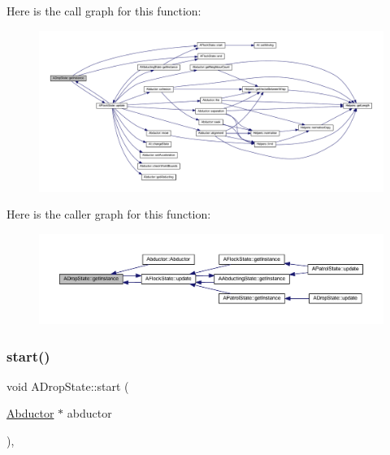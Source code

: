 Here is the call graph for this function\+:
\nopagebreak
\begin{figure}[H]
\begin{center}
\leavevmode
\includegraphics[width=350pt]{class_a_drop_state_a836c382a58447787d3c1518cccea8ebc_cgraph}
\end{center}
\end{figure}
Here is the caller graph for this function\+:
\nopagebreak
\begin{figure}[H]
\begin{center}
\leavevmode
\includegraphics[width=350pt]{class_a_drop_state_a836c382a58447787d3c1518cccea8ebc_icgraph}
\end{center}
\end{figure}
\mbox{\label{class_a_drop_state_ab41abe3006ca9d4dec5e93a800a03e01}} 
\subsubsection{\texorpdfstring{start()}{start()}}
{\footnotesize\ttfamily void A\+Drop\+State\+::start (\begin{DoxyParamCaption}\item[{\hyperlink{class_abductor}{Abductor} $\ast$}]{abductor }\end{DoxyParamCaption})\hspace{0.3cm}{\ttfamily [override]}, {\ttfamily [virtual]}}



